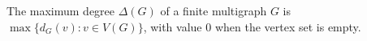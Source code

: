 \begin{definition}
The maximum degree $\Delta(G)$ of a finite multigraph $G$ is
$\max\{d_G(v):v\in V(G)\}$, with value $0$ when the vertex set is empty.
\end{definition}
